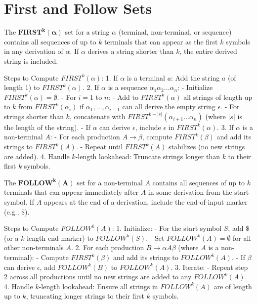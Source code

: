 \section{First and Follow Sets}

The $\mathbf{FIRST^k(\alpha)}$ set for a string $\alpha$ (terminal, non-terminal, or sequence) contains all sequences of up to $k$ terminals that can appear as the first $k$ symbols in any derivation of $\alpha$. If $\alpha$ derives a string shorter than $k$, the entire derived string is included.

Steps to Compute $FIRST^k(\alpha)$:
1. If $\alpha$ is a terminal $a$: Add the string $a$ (of length 1) to $FIRST^k(\alpha)$.
2. If $\alpha$ is a sequence $\alpha_1 \alpha_2 \dots \alpha_n$:
   - Initialize $FIRST^k(\alpha) = \emptyset$.
   - For $i = 1$ to $n$:
     - Add to $FIRST^k(\alpha)$ all strings of length up to $k$ from $FIRST^k(\alpha_i)$ if $\alpha_1, \dots, \alpha_{i-1}$ can all derive the empty string $\epsilon$.
     - For strings shorter than $k$, concatenate with $FIRST^{k-|s|}(\alpha_{i+1} \dots \alpha_n)$ (where $|s|$ is the length of the string).
   - If $\alpha$ can derive $\epsilon$, include $\epsilon$ in $FIRST^k(\alpha)$.
3. If $\alpha$ is a non-terminal $A$:
   - For each production $A \to \beta$, compute $FIRST^k(\beta)$ and add its strings to $FIRST^k(A)$.
   - Repeat until $FIRST^k(A)$ stabilizes (no new strings are added).
4. Handle $k$-length lookahead: Truncate strings longer than $k$ to their first $k$ symbols.

The $\mathbf{FOLLOW^k(A)}$ set for a non-terminal $A$ contains all sequences of up to $k$ terminals that can appear immediately after $A$ in some derivation from the start symbol. If $A$ appears at the end of a derivation, include the end-of-input marker (e.g., $\$$).

Steps to Compute $FOLLOW^k(A)$:
1. Initialize:
   - For the start symbol $S$, add $\$$ (or a $k$-length end marker) to $FOLLOW^k(S)$.
   - Set $FOLLOW^k(A) = \emptyset$ for all other non-terminals $A$.
2. For each production $B \to \alpha A \beta$ (where $A$ is a non-terminal):
   - Compute $FIRST^k(\beta)$ and add its strings to $FOLLOW^k(A)$.
   - If $\beta$ can derive $\epsilon$, add $FOLLOW^k(B)$ to $FOLLOW^k(A)$.
3. Iterate:
   - Repeat step 2 across all productions until no new strings are added to any $FOLLOW^k(A)$.
4. Handle $k$-length lookahead: Ensure all strings in $FOLLOW^k(A)$ are of length up to $k$, truncating longer strings to their first $k$ symbols.
